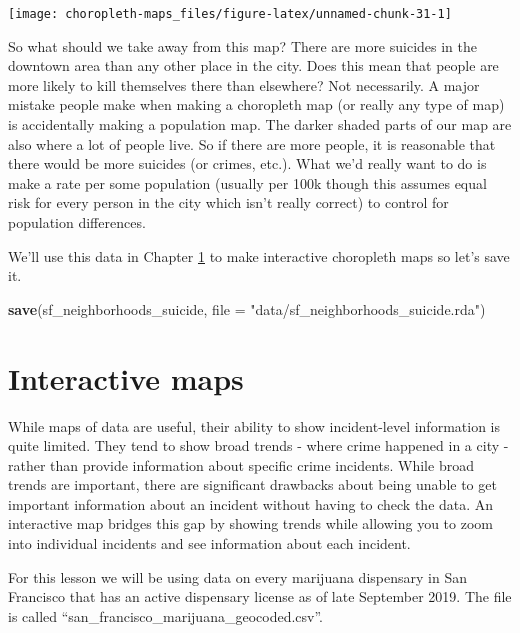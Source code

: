 \documentclass[
  12pt,
]{book}
\newenvironment{Shaded}{\begin{snugshade}}{\end{snugshade}}
\newcommand{\DataTypeTok}[1]{\textcolor[rgb]{0.13,0.29,0.53}{#1}}
\newcommand{\KeywordTok}[1]{\textcolor[rgb]{0.13,0.29,0.53}{\textbf{#1}}}
\newcommand{\NormalTok}[1]{#1}
\newcommand{\StringTok}[1]{\textcolor[rgb]{0.31,0.60,0.02}{#1}}
\begin{document}
\begin{center}\texttt{[image: choropleth-maps\_files/figure-latex/unnamed-chunk-31-1]} \end{center}

So what should we take away from this map? There are more suicides in the downtown area than any other place in the city. Does this mean that people are more likely to kill themselves there than elsewhere? Not necessarily. A major mistake people make when making a choropleth map (or really any type of map) is accidentally making a population map. The darker shaded parts of our map are also where a lot of people live. So if there are more people, it is reasonable that there would be more suicides (or crimes, etc.). What we'd really want to do is make a rate per some population (usually per 100k though this assumes equal risk for every person in the city which isn't really correct) to control for population differences.

We'll use this data in Chapter \ref{interactive-maps} to make interactive choropleth maps so let's save it.

\begin{Shaded}
\begin{Highlighting}[]
\KeywordTok{save}\NormalTok{(sf\_neighborhoods\_suicide, }\DataTypeTok{file =} \StringTok{"data/sf\_neighborhoods\_suicide.rda"}\NormalTok{)}
\end{Highlighting}
\end{Shaded}

\hypertarget{interactive-maps}{%
\chapter{Interactive maps}\label{interactive-maps}}

While maps of data are useful, their ability to show incident-level information is quite limited. They tend to show broad trends - where crime happened in a city - rather than provide information about specific crime incidents. While broad trends are important, there are significant drawbacks about being unable to get important information about an incident without having to check the data. An interactive map bridges this gap by showing trends while allowing you to zoom into individual incidents and see information about each incident.

For this lesson we will be using data on every marijuana dispensary in San Francisco that has an active dispensary license as of late September 2019. The file is called ``san\_francisco\_marijuana\_geocoded.csv''.
\end{document}
